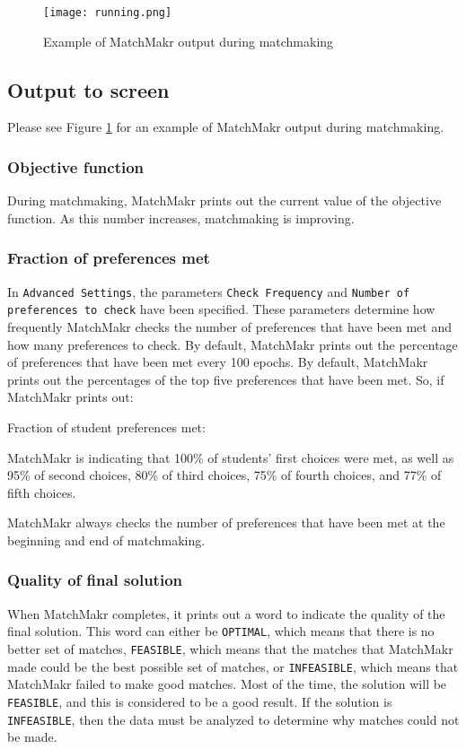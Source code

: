 \begin{figure}
	\centering
	\texttt{[image: running.png]}
	\caption{\label{fig:running} Example of MatchMakr output during matchmaking}
\end{figure}

\subsection{Output to screen}
Please see Figure \ref{fig:running} for an example of MatchMakr output during matchmaking.

\subsubsection{Objective function}
During matchmaking, MatchMakr prints out the current value of the objective function.  As this number increases, matchmaking is improving.

\subsubsection{Fraction of preferences met}
In \texttt{Advanced Settings}, the parameters \texttt{Check Frequency} and \texttt{Number of preferences to check} have been specified.  These parameters determine how frequently MatchMakr checks the number of preferences that have been met and how many preferences to check.  By default, MatchMakr prints out the percentage of preferences that have been met every 100 epochs.  By default, MatchMakr prints out the percentages of the top five preferences that have been met.  So, if MatchMakr prints out:


Fraction of student preferences met: \\
\left[1.0, 0.95, 0.8, 0.75, 0.77\right]


MatchMakr is indicating that 100\% of students' first choices were met, as well as 95\% of second choices, 80\% of third choices, 75\% of fourth choices, and 77\% of fifth choices.

MatchMakr always checks the number of preferences that have been met at the beginning and end of matchmaking.

\subsubsection{Quality of final solution}
When MatchMakr completes, it prints out a word to indicate the quality of the final solution.  This word can either be \texttt{OPTIMAL}, which means that there is no better set of matches, \texttt{FEASIBLE}, which means that the matches that MatchMakr made could be the best possible set of matches, or \texttt{INFEASIBLE}, which means that MatchMakr failed to make good matches.  Most of the time, the solution will be \texttt{FEASIBLE}, and this is considered to be a good result.  If the solution is \texttt{INFEASIBLE}, then the data must be analyzed to determine why matches could not be made.

